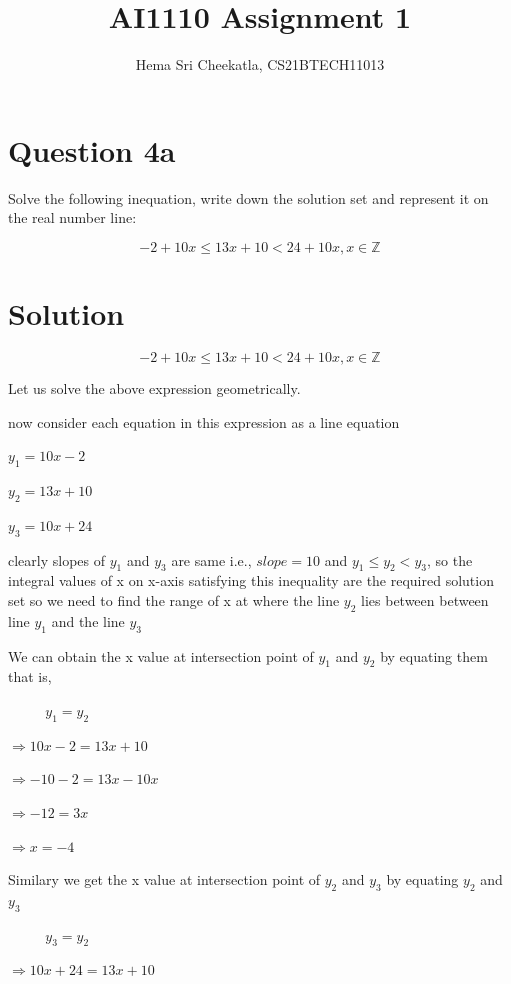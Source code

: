 \documentclass[16pt, a4paper, two column]{article}
\title{AI1110 Assignment 1}
\author{Hema Sri Cheekatla, CS21BTECH11013}
\begin{document}
\maketitle
\section*{Question 4a}
Solve the following inequation, write down the solution set and represent it on the real number line:

\[  -2 + 10x \leq 13x + 10 < 24 + 10x,  x\in \mathbb{Z} \]

\section*{Solution}
\[  -2 + 10x \leq 13x + 10 < 24 + 10x,  x\in \mathbb{Z} \]

Let us solve the above expression geometrically.

now consider each equation in this expression as a line equation

$y_1 = 10x - 2$

$y_2 = 13x + 10$

$y_3 = 10x + 24$

clearly slopes of $y_1$ and $y_3$ are same i.e., $slope = 10$\newline
and $y_1 \leq y_2 < y_3 $, so the integral values of x on x-axis satisfying this inequality are the required solution set\newline
so we need to find the range of x at where the line $y_2$ lies between between line $y_1$ and the line $y_3$

We can obtain the x value at intersection point of $y_1$ and $y_2$ by equating them that is,


$\hspace{16pt}\hspace{16pt} y_1 = y_2$

$\Rightarrow 10x - 2 = 13x + 10$

$\Rightarrow -10 -2 = 13x - 10x$

$\Rightarrow -12 = 3x$

$\Rightarrow x = -4$

Similary we get the x value at intersection point of $y_2$ and $y_3$ by equating $y_2$ and $y_3$


$\hspace{16pt}\hspace{16pt} y_3 = y_2$

$\Rightarrow 10x + 24 = 13x + 10$
\end{document}
